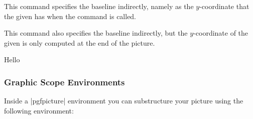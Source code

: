 \begin{command}{\pgfsetbaselinepointnow{}}
    This command specifies the baseline indirectly, namely as the
    $y$-coordinate that the given  has when the command is called.
\end{command}

\begin{command}{\pgfsetbaselinepointlater{}}
    This command also specifies the baseline indirectly, but the $y$-coordinate
    of the given  is only computed at the end of the picture.
\begin{codeexample}[pre={\begin{lateximage}},post={\end{lateximage}},preamble={\usetikzlibrary{shapes.misc}}]
Hello
\begin{pgfpicture}
\end{pgfpicture}
\end{codeexample}
\end{command}


\subsubsection{Graphic Scope Environments}

Inside a |{pgfpicture}| environment you can substructure your picture using the
following environment:

